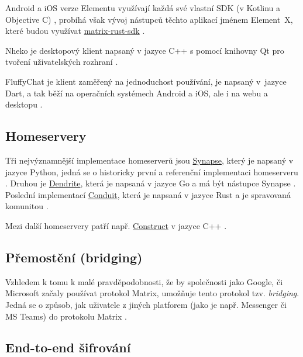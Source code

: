 Android a iOS verze Elementu využívají každá své vlastní SDK (v Kotlinu a
Objective C) \cite{GitHub-ElementAndroid,GitHub-ElementIOS}, probíhá však vývoj
nástupců těchto aplikací jménem Element~X, které budou využívat
\href{https://github.com/matrix-org/matrix-rust-sdk}{matrix-rust-sdk}
\cite{GitHub-ElementXAndroid,GitHub-ElementXIOS}.

Nheko je desktopový klient napsaný v jazyce C++ s pomocí knihovny Qt pro tvoření
uživatelských rozhraní \cite{GitHub-Nheko}.

FluffyChat je klient zaměřený na jednoduchost používání, je napsaný v~jazyce
Dart, a tak běží na operačních systémech Android a iOS, ale i na webu a
desktopu \cite{FluffyChat-Homepage,GitLab-FluffyChat}.

\subsection{Homeservery}

Tři nejvýznamnější implementace homeserverů jsou
\href{https://github.com/matrix-org/synapse/}{Synapse}, který je napsaný v
jazyce Python, jedná se o historicky první a referenční implementaci homeserveru
\cite{GitHub-Synapse}. Druhou je
\href{https://github.com/matrix-org/dendrite/}{Dendrite}, která je napsaná v
jazyce Go a má být nástupce Synapse \cite{GitHub-Dendrite}. Poslední implementací
\href{https://github.com/timokoesters/conduit}{Conduit}, která je napsaná v
jazyce Rust a je spravovaná komunitou \cite{GitHub-Conduit}.

Mezi další homeservery patří např.
\href{https://github.com/matrix-construct/construct}{Construct} v jazyce C++
\cite{GitHub-Construct}.

\subsection{Přemostění (bridging)}

Vzhledem k tomu k malé pravděpodobnosti, že by společnosti jako Google, či
Microsoft začaly používat protokol Matrix, umožňuje tento protokol tzv.
\textit{bridging}. Jedná se o způsob, jak  uživatele z jiných
platforem (jako je např. Messenger či MS Teams) do protokolu Matrix
\cite{MatrixORG-Bridges}.

\subsection{End-to-end šifrování}\label{matrix-encryption}

